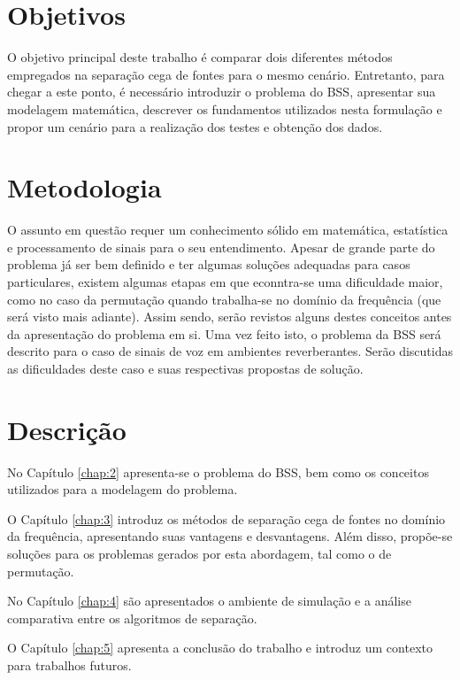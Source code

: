 \section{Objetivos}

O objetivo principal deste trabalho é comparar dois diferentes métodos empregados na separação cega de fontes para o mesmo cenário. Entretanto, para chegar a este ponto, é necessário introduzir o problema do BSS, apresentar sua modelagem matemática, descrever os fundamentos utilizados nesta formulação e propor um cenário para a realização dos testes e obtenção dos dados.


\section{Metodologia}

O assunto em questão requer um conhecimento sólido em matemática, estatística e processamento de sinais para o seu entendimento. Apesar de grande parte do problema já ser bem definido e ter algumas soluções adequadas para casos particulares, existem algumas etapas em que econntra-se uma dificuldade maior, como no caso da permutação quando trabalha-se no domínio da frequência (que será visto mais adiante). Assim sendo, serão revistos alguns destes conceitos antes da apresentação do problema em si. Uma vez feito isto, o problema da BSS será descrito para o caso de sinais de voz em ambientes reverberantes. Serão discutidas as dificuldades deste caso e suas respectivas propostas de solução.


\section{Descrição}

No Capítulo \ref{chap:2} apresenta-se o problema do BSS, bem como os conceitos utilizados para a modelagem do problema.

O Capítulo \ref{chap:3} introduz os métodos de separação cega de fontes no domínio da frequência, apresentando suas vantagens e desvantagens. Além disso, propõe-se soluções para os problemas gerados por esta abordagem, tal como o de permutação.

No Capítulo \ref{chap:4} são apresentados o ambiente de simulação e a análise comparativa entre os algoritmos de separação.

O Capítulo \ref{chap:5} apresenta a conclusão do trabalho e introduz um contexto para trabalhos futuros.

